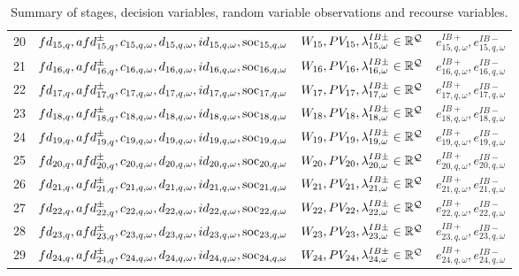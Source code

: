 \begin{table}[H]
\begin{tabular}{c c c c}
	20& $fd_{15,q}, afd^{\pm}_{15,q}, c_{15,q, \omega}, d_{15,q, \omega}, id_{15,q, \omega}, \text{soc}_{15,q, \omega}$ & $W_{15}, PV_{15}, \lambda^{IB\pm}_{15, \omega} \in \mathbb{R}^\mathcal{Q}$ & $e^{IB+}_{15,q, \omega}, e^{IB-}_{15,q, \omega}$\\
	21& $fd_{16,q}, afd^{\pm}_{16,q}, c_{16,q, \omega}, d_{16,q, \omega}, id_{16,q, \omega}, \text{soc}_{16,q, \omega}$ & $W_{16}, PV_{16}, \lambda^{IB\pm}_{16, \omega} \in \mathbb{R}^\mathcal{Q}$ & $e^{IB+}_{16,q, \omega}, e^{IB-}_{16,q, \omega}$\\
	22& $fd_{17,q}, afd^{\pm}_{17,q}, c_{17,q, \omega}, d_{17,q, \omega}, id_{17,q, \omega}, \text{soc}_{17,q, \omega}$ & $W_{17}, PV_{17}, \lambda^{IB\pm}_{17, \omega} \in \mathbb{R}^\mathcal{Q}$ & $e^{IB+}_{17,q, \omega}, e^{IB-}_{17,q, \omega}$\\
	23& $fd_{18,q}, afd^{\pm}_{18,q}, c_{18,q, \omega}, d_{18,q, \omega}, id_{18,q, \omega}, \text{soc}_{18,q, \omega}$ & $W_{18}, PV_{18}, \lambda^{IB\pm}_{18, \omega} \in \mathbb{R}^\mathcal{Q}$ &  $e^{IB+}_{18,q, \omega}, e^{IB-}_{18,q, \omega}$\\
	24& $fd_{19,q}, afd^{\pm}_{19,q}, c_{19,q, \omega}, d_{19,q, \omega}, id_{19,q, \omega}, \text{soc}_{19,q, \omega}$ & $W_{19}, PV_{19}, \lambda^{IB\pm}_{19, \omega} \in \mathbb{R}^\mathcal{Q}$ & $e^{IB+}_{19,q, \omega}, e^{IB-}_{19,q, \omega}$\\
	25& $fd_{20,q}, afd^{\pm}_{20,q}, c_{20,q, \omega}, d_{20,q, \omega}, id_{20,q, \omega}, \text{soc}_{20,q, \omega}$  & $W_{20}, PV_{20}, \lambda^{IB\pm}_{20, \omega} \in \mathbb{R}^\mathcal{Q}$ & $e^{IB+}_{20,q, \omega}, e^{IB-}_{20,q, \omega}$\\
	26&  $fd_{21,q}, afd^{\pm}_{21,q}, c_{21,q, \omega}, d_{21,q, \omega}, id_{21,q, \omega}, \text{soc}_{21,q, \omega}$ & $W_{21}, PV_{21}, \lambda^{IB\pm}_{21, \omega} \in \mathbb{R}^\mathcal{Q}$ & $e^{IB+}_{21,q, \omega}, e^{IB-}_{21,q, \omega}$\\
	27& $fd_{22,q}, afd^{\pm}_{22,q}, c_{22,q, \omega}, d_{22,q, \omega}, id_{22,q, \omega}, \text{soc}_{22,q, \omega}$ & $W_{22}, PV_{22}, \lambda^{IB\pm}_{22, \omega} \in \mathbb{R}^\mathcal{Q}$ & $e^{IB+}_{22,q, \omega}, e^{IB-}_{22,q, \omega}$\\
	28& $fd_{23,q}, afd^{\pm}_{23,q}, c_{23,q, \omega}, d_{23,q, \omega}, id_{23,q, \omega}, \text{soc}_{23,q, \omega}$ & $W_{23}, PV_{23}, \lambda^{IB\pm}_{23, \omega} \in \mathbb{R}^\mathcal{Q}$ & $e^{IB+}_{23,q, \omega}, e^{IB-}_{23,q, \omega}$\\
	29& $fd_{24,q}, afd^{\pm}_{24,q}, c_{24,q, \omega}, d_{24,q, \omega}, id_{24,q, \omega}, \text{soc}_{24,q, \omega}$ & $W_{24}, PV_{24}, \lambda^{IB\pm}_{24, \omega} \in \mathbb{R}^\mathcal{Q}$ & $e^{IB+}_{24,q, \omega}, e^{IB-}_{24,q, \omega}$\\
\end{tabular}
\caption{Summary of stages, decision variables, random variable observations and recourse variables.}
\label{TABLE:stages-rv-dv-subperiods}
\end{table}